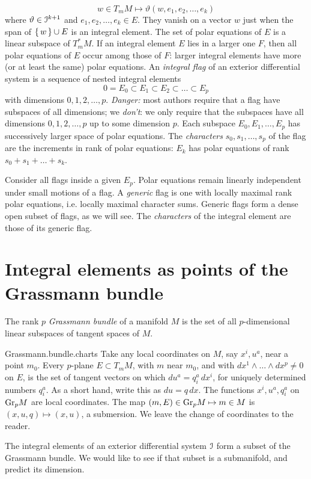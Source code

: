 \[
w \in T_m M \mapsto \vartheta(w,e_1,e_2,\dots,e_k)
\]
where \(\vartheta\in\mathcal{I}^{k+1}\) and \(e_1,e_2,\dots,e_k\in E\).
They vanish on a vector \(w\) just when the span of \(\set{w}\cup E\) is an integral element.
The set of polar equations of \(E\) is a linear subspace of \(T_m^* M\).
If an integral element \(E\) lies in a larger one \(F\), then all polar equations of \(E\) occur among those of \(F\): larger integral elements have more (or at least the same) polar equations.
An \emph{integral flag} of an exterior differential system is a sequence of nested integral elements
\[
0=E_0 \subset E_1 \subset E_2 \subset \dots \subset E_p
\]
with dimensions \(0,1,2,\dots,p\).
\emph{Danger:} most authors require that a flag have subspaces of all dimensions; we \emph{don't}: we only require that the subspaces have all dimensions \(0,1,2,\dots,p\) up to some dimension \(p\).
Each subspace \(E_0,E_1,\dots,E_p\) has successively larger space of polar equations.
The \emph{characters} \(s_0,s_1,\dots,s_p\) of the flag are the increments in rank of polar equations: \(E_k\) has polar equations of rank \(s_0+s_1+\dots+s_k\).

Consider all flags inside a given \(E_p\).
Polar equations remain linearly independent under small motions of a flag.
A \emph{generic} flag is one with locally maximal rank polar equations, i.e. locally maximal character sums.
Generic flags form a dense open subset of flags, as we will see.
The \emph{characters} of the integral element are those of its generic flag.

\section{Integral elements as points of the Grassmann bundle}
The rank \(p\) \emph{Grassmann bundle} of a manifold \(M\) is the set of all \(p\)-dimensional linear subspaces of tangent spaces of \(M\).
%
\begin{answer}{Grassmann.bundle.charts}%
Take any local coordinates on \(M\), say \(x^i,u^a\), near a point \(m_0\).
Every \(p\)-plane \(E \subset T_m M\), with \(m\) near \(m_0\), and with \(dx^1\wedge \dots \wedge dx^p \ne 0\) on \(E\), is the set of tangent vectors on which \(du^a = q^a_i \, dx^i\), for uniquely determined numbers \(q^a_i\).
As a short hand, write this as \(du=q \, dx\).
The functions \(x^i,u^a,q^a_i\) on \(\operatorname{Gr}_{p}\!M\) are local coordinates.
The map \((m,E)\in\operatorname{Gr}_{p}\!M \mapsto m\in M\) is \((x,u,q)\mapsto (x,u)\), a submersion.
We leave the change of coordinates to the reader.%
\end{answer}
The integral elements of an exterior differential system \(\mathcal{I}\) form a subset of the Grassmann bundle.
We would like to see if that subset is a submanifold, and predict its dimension.

